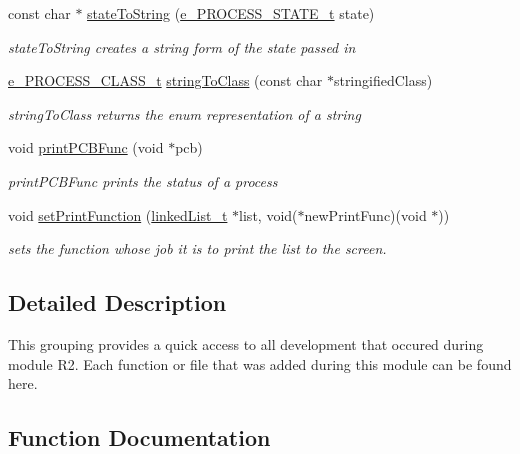 \begin{DoxyCompactItemize}
const char $\ast$ \hyperlink{group___r2_ga8667e4228a987f7d43e598f9855e9a52}{state\+To\+String} (\hyperlink{pcb_8h_a8461d6c03c00b03bad59b5a29d27b902}{e\+\_\+\+P\+R\+O\+C\+E\+S\+S\+\_\+\+S\+T\+A\+T\+E\+\_\+t} state)
\begin{DoxyCompactList}\small\item\em state\+To\+String creates a string form of the state passed in \end{DoxyCompactList}\item 
\hyperlink{pcb_8h_ab3268ce0bdfc94e5757917d42c73d9f1}{e\+\_\+\+P\+R\+O\+C\+E\+S\+S\+\_\+\+C\+L\+A\+S\+S\+\_\+t} \hyperlink{group___r2_gae81b3dd13059be0733193c53681ca440}{string\+To\+Class} (const char $\ast$stringified\+Class)
\begin{DoxyCompactList}\small\item\em string\+To\+Class returns the enum representation of a string \end{DoxyCompactList}\item 
void \hyperlink{group___r2_ga819c31d0b376ca33ed371253585f9f80}{print\+P\+C\+B\+Func} (void $\ast$pcb)
\begin{DoxyCompactList}\small\item\em print\+P\+C\+B\+Func prints the status of a process \end{DoxyCompactList}\item 
void \hyperlink{group___r2_gafc8969d7969f61c928a01f4c302e669b}{set\+Print\+Function} (\hyperlink{structlinked_list__t}{linked\+List\+\_\+t} $\ast$list, void($\ast$new\+Print\+Func)(void $\ast$))
\begin{DoxyCompactList}\small\item\em sets the function whose job it is to print the list to the screen. \end{DoxyCompactList}\end{DoxyCompactItemize}


\subsection{Detailed Description}
This grouping provides a quick access to all development that occured during module R2. Each function or file that was added during this module can be found here. 

\subsection{Function Documentation}
